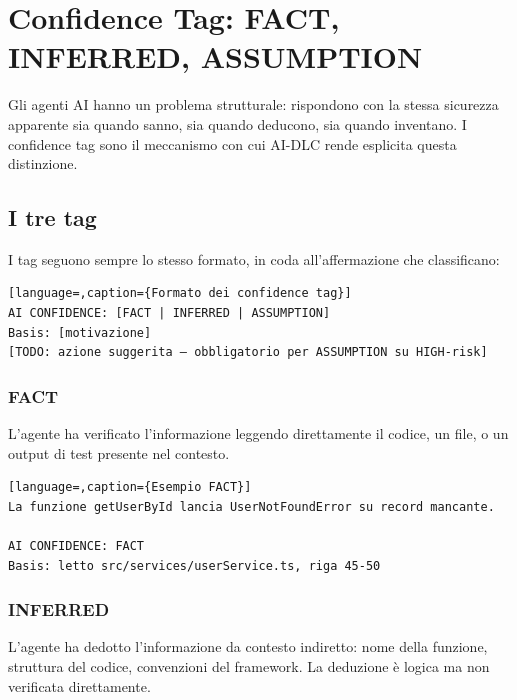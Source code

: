﻿%

\chapter{Confidence Tag: FACT, INFERRED, ASSUMPTION}
\label{ch:confidence-tags}

Gli agenti AI hanno un problema strutturale: rispondono con la stessa sicurezza apparente sia quando sanno, sia quando deducono, sia quando inventano. I confidence tag sono il meccanismo con cui AI-DLC rende esplicita questa distinzione.

\section{I tre tag}
\label{sec:09-tre-tag}

I tag seguono sempre lo stesso formato, in coda all'affermazione che classificano:

\begin{lstlisting}[language=,caption={Formato dei confidence tag}]
AI CONFIDENCE: [FACT | INFERRED | ASSUMPTION]
Basis: [motivazione]
[TODO: azione suggerita — obbligatorio per ASSUMPTION su HIGH-risk]
\end{lstlisting}

\subsection*{FACT}

L'agente ha verificato l'informazione leggendo direttamente il codice, un file, o un output di test presente nel contesto.

\begin{lstlisting}[language=,caption={Esempio FACT}]
La funzione getUserById lancia UserNotFoundError su record mancante.

AI CONFIDENCE: FACT
Basis: letto src/services/userService.ts, riga 45-50
\end{lstlisting}

\subsection*{INFERRED}

L'agente ha dedotto l'informazione da contesto indiretto: nome della funzione, struttura del codice, convenzioni del framework. La deduzione è logica ma non verificata direttamente.

